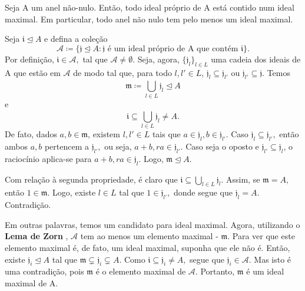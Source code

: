 \documentclass[algebraII_notes.tex]{subfiles}
\begin{document}
\begin{theorem*}
	Seja A um anel não-nulo. Então, todo ideal próprio de A está contido num ideal maximal. Em particular, todo anel
	não nulo tem pelo menos um ideal maximal.
\end{theorem*}
\begin{proof*}
	Seja \(\mathfrak{i}\trianglelefteq A\) e defina a coleção
	\[
		\mathcal{A} \coloneqq \{\mathfrak{j}\trianglelefteq A: \mathfrak{j} \text{ é um ideal próprio de A que contém }\mathfrak{i}\}.
	\]
	Por definição, \(\mathfrak{i}\in \mathcal{A},\) tal que \(\mathcal{A}\neq\emptyset.\) Seja, agora, \(\{\mathfrak{j}_{l}\}_{l\in L}\) uma cadeia
	dos ideais de A que estão em \(\mathcal{A}\) de modo tal que, para todo \(l, l'\in L\),
	\(\mathfrak{j}_{l}\subseteq \mathfrak{j}_{l'}\) ou \(\mathfrak{j}_{l'}\subseteq \mathfrak{j}\). Temos
	\[
		\mathfrak{m}\coloneqq \bigcup_{l\in L}^{}\mathfrak{j}_{l}\trianglelefteq A
	\]
	e
	\[
		\mathfrak{i}\subseteq \bigcup_{l\in L}^{}\mathfrak{j}_{l}\neq A.
	\]
	De fato, dados \(a, b\in \mathfrak{m}\), existem \(l, l'\in L\) tais que \(a\in \mathfrak{j}_{l}, b\in \mathfrak{j}_{l'}\).
	Caso \(\mathfrak{j}_{l}\subseteq \mathfrak{j}_{l'},\) então ambos \(a, b\) pertencem a \(\mathfrak{j}_{l'},\) ou seja, \(a + b, ra\in \mathfrak{j}_{l'}.\) Caso
	seja o oposto e \(\mathfrak{j}_{l'}\subseteq \mathfrak{j}_{l}\), o raciocínio aplica-se para \(a + b, ra\in \mathfrak{j}_{l}\). Logo, \(\mathfrak{m}\trianglelefteq A.\)

	Com relação à segunda propriedade, é claro que \(\mathfrak{i}\subseteq \bigcup_{l\in L}^{}\mathfrak{j}_{l}.\) Assim, se
	\(\mathfrak{m} = A,\) então \(1\in \mathfrak{m}.\) Logo, existe \(l\in L\) tal que \(1\in \mathfrak{j}_{l'},\) donde segue que
	\(\mathfrak{j}_{l} = A.\) Contradição.

	Em outras palavras, temos um candidato para ideal maximal. Agora, utilizando o \textbf{Lema de Zorn} , \(\mathcal{A}\) tem
	ao menos um elemento maximal - \(\mathfrak{m}\). Para ver que este elemento maximal é, de fato, um ideal maximal, suponha que ele não é. Então, existe \(\mathfrak{j}_{i} \trianglelefteq A\) tal que
	\(\mathfrak{m}\subsetneq \mathfrak{j}_{i} \subsetneq A\). Como \(\mathfrak{i}\subseteq \mathfrak{j}_{i}\neq A,\) segue que \(\mathfrak{j}_{i}\in \mathcal{A}.\) Mas isto é uma contradição,
	pois \(\mathfrak{m}\) é o elemento maximal de \(\mathcal{A}.\) Portanto, \(\mathfrak{m}\) é um ideal maximal de A. \qedsymbol
\end{proof*}
\end{document}
